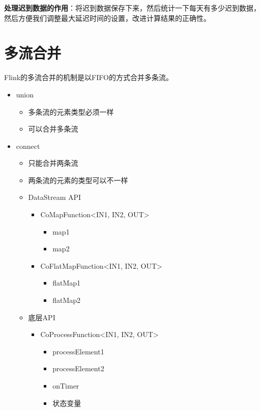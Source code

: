 \documentclass[cn,11pt,chinese]{elegantbook}
\begin{document}
\textbf{处理迟到数据的作用}：将迟到数据保存下来，然后统计一下每天有多少迟到数据，然后方便我们调整最大延迟时间的设置，改进计算结果的正确性。

\chapter{多流合并}

Flink的多流合并的机制是以FIFO的方式合并多条流。

\begin{itemize}
  \item union
    \begin{itemize}
      \item 多条流的元素类型必须一样
      \item 可以合并多条流
    \end{itemize}
  \item connect
    \begin{itemize}
      \item 只能合并两条流
      \item 两条流的元素的类型可以不一样
      \item DataStream API
      \begin{itemize}
        \item CoMapFunction<IN1, IN2, OUT>
        \begin{itemize}
          \item map1
          \item map2
        \end{itemize}
        \item CoFlatMapFunction<IN1, IN2, OUT>
        \begin{itemize}
          \item flatMap1
          \item flatMap2
        \end{itemize}
      \end{itemize}
      \item 底层API
      \begin{itemize}
        \item CoProcessFunction<IN1, IN2, OUT>
        \begin{itemize}
          \item processElement1
          \item processElement2
          \item onTimer
          \item 状态变量
        \end{itemize}
      \end{itemize}

\end{itemize}
\end{itemize}
\end{document}
